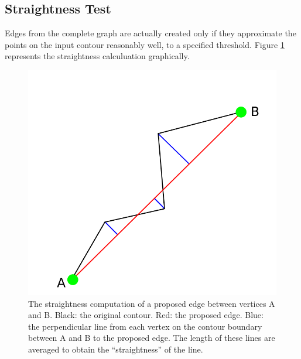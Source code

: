 \documentclass{InsightArticle}
\begin{document}
\subsection{Straightness Test}
\label{sec:Algorithm:StraightnessTest}
Edges from the complete graph are actually created only if they approximate the points on the input contour reasonably well, to a specified threshold. Figure \ref{fig:Straightness} represents the straightness calculuation graphically.
\begin{figure}[H]
  \centering
  \includegraphics[width=0.3\linewidth]{images/straightness}
  \caption{The straightness computation of a proposed edge between vertices A and B. Black: the original contour. Red: the proposed edge. Blue: the perpendicular line from each vertex on the contour boundary between A and B to the proposed edge. The length of these lines are averaged to obtain the ``straightness'' of the line.}
  \label{fig:Straightness}
\end{figure}
\end{document}
